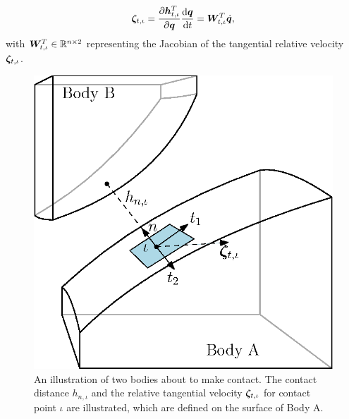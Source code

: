 \documentclass[../DC2017114Bouma.tex]{subfiles}
\begin{document}
\begin{align}
\boldsymbol{\zeta}_{t,\iota} = \frac{\partial {\boldsymbol{h}}^T_{t,\iota}}{\partial{\boldsymbol{q}}}\frac{\text{d}{\boldsymbol{q}}}{\text{d} t} = {\boldsymbol{W}}_{t,\iota}^T\dot{{\boldsymbol{q}}},
\end{align}
with ${\boldsymbol{W}}^T_{t,\iota}\in\mathbb{R}^{n\times 2}$ representing the Jacobian of the tangential relative velocity $\boldsymbol{\zeta}_{t,\iota}$.
\begin{figure}[h]
\centering
\includegraphics[width=.5\textwidth]{contactplanes2.eps}\caption{An illustration of two bodies about to make contact. The contact distance $h_{n,\iota}$ and the relative tangential velocity $\boldsymbol{\zeta}_{t,\iota}$ for contact point $\iota$ are illustrated, which are defined on the surface of Body A.} \label{fig:contactplanes}
\end{figure}
\end{document}
